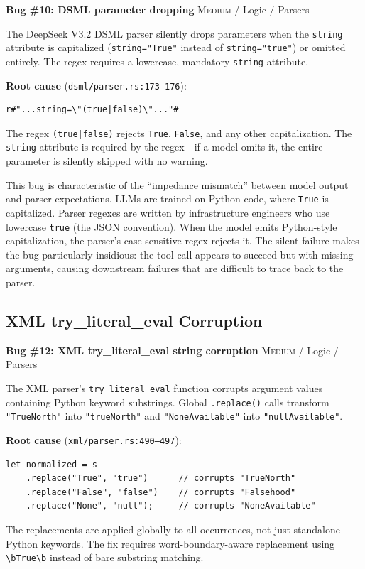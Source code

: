 \begin{bugbox}
\textbf{Bug \#10: DSML parameter dropping} \hfill \textsc{Medium} / Logic / Parsers

The DeepSeek V3.2 DSML parser silently drops parameters when the \texttt{string} attribute is capitalized (\texttt{string="True"} instead of \texttt{string="true"}) or omitted entirely. The regex requires a lowercase, mandatory \texttt{string} attribute.

\medskip
\textbf{Root cause} (\texttt{dsml/parser.rs:173--176}):
\begin{verbatim}
r#"...string=\"(true|false)\"..."#
\end{verbatim}

The regex \texttt{(true|false)} rejects \texttt{True}, \texttt{False}, and any other capitalization. The \texttt{string} attribute is required by the regex---if a model omits it, the entire parameter is silently skipped with no warning.
\end{bugbox}

This bug is characteristic of the ``impedance mismatch'' between model output and parser expectations. LLMs are trained on Python code, where \texttt{True} is capitalized. Parser regexes are written by infrastructure engineers who use lowercase \texttt{true} (the JSON convention). When the model emits Python-style capitalization, the parser's case-sensitive regex rejects it. The silent failure makes the bug particularly insidious: the tool call appears to succeed but with missing arguments, causing downstream failures that are difficult to trace back to the parser.

\subsection{XML try\_literal\_eval Corruption}

\begin{bugbox}
\textbf{Bug \#12: XML try\_literal\_eval string corruption} \hfill \textsc{Medium} / Logic / Parsers

The XML parser's \texttt{try\_literal\_eval} function corrupts argument values containing Python keyword substrings. Global \texttt{.replace()} calls transform \texttt{"TrueNorth"} into \texttt{"trueNorth"} and \texttt{"NoneAvailable"} into \texttt{"nullAvailable"}.

\medskip
\textbf{Root cause} (\texttt{xml/parser.rs:490--497}):
\begin{verbatim}
let normalized = s
    .replace("True", "true")      // corrupts "TrueNorth"
    .replace("False", "false")    // corrupts "Falsehood"
    .replace("None", "null");     // corrupts "NoneAvailable"
\end{verbatim}

The replacements are applied globally to all occurrences, not just standalone Python keywords. The fix requires word-boundary-aware replacement using \texttt{\textbackslash bTrue\textbackslash b} instead of bare substring matching.
\end{bugbox}

